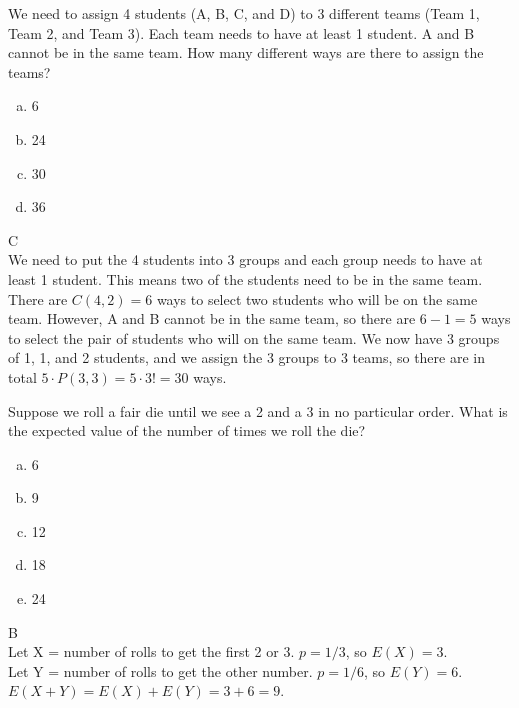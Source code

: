 
We need to assign 4 students (A, B, C, and D) to 3 different teams (Team 1, Team 2, and Team 3). Each team needs to have at least 1 student. A and B cannot be in the same team. How many different ways are there to assign the teams?
\begin{enumerate}[(a)]
	\item  6  
    
	\item  24 
    
	\item  30
    
	\item  36

\end{enumerate}
\begin{solution}

C
\\
We need to put the 4 students into 3 groups and each group needs to have at least 1 student. This means two of the students need to be in the same team.  There are $C(4, 2)=6$ ways to select two students who will be on the same team. However, A and B cannot be in the same team, so there are $6-1=5$ ways to select the pair of students who will on the same team. We now have 3 groups of 1, 1, and 2 students, and we assign the 3 groups to 3 teams, so there are in total $5 \cdot P(3, 3)= 5 \cdot 3! = 30$ ways.


\end{solution}

Suppose we roll a fair die until we see a 2 and a 3 in no particular order. What is the expected value of the number of times we roll the die?

\begin{enumerate}[(a)]
	\item  6

	\item  9

	\item  12

	\item  18

	\item  24

\end{enumerate}
\begin{solution}

B
\\
Let X = number of rolls to get the first 2 or 3. $p=1/3$, so $E(X)=3$.\\
Let Y = number of rolls to get the other number. $p=1/6$, so $E(Y)=6$.\\
$E(X + Y) = E(X) + E(Y) = 3 + 6 = 9$.

\end{solution}

